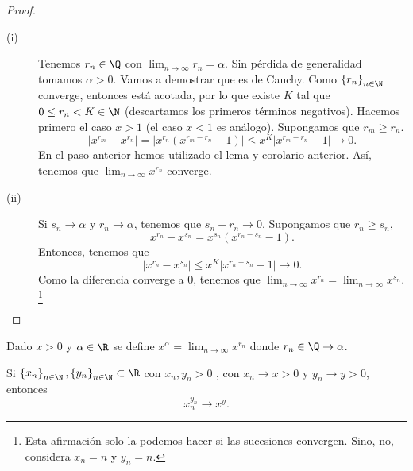 \begin{proof}
\begin{description}
	\item[(i)] Tenemos $\displaystyle r_{n}\in\Q $ con $\displaystyle \lim_{n \to \infty}r_{n}=\alpha  $. Sin pérdida de generalidad tomamos $\displaystyle \alpha > 0 $. Vamos a demostrar que es de Cauchy. Como $\displaystyle \left\{ r_{n}\right\} _{n\in\N}$ converge, entonces está acotada, por lo que existe $\displaystyle K $ tal que $\displaystyle 0 \leq r_{n} < K \in \N $ (descartamos los primeros términos negativos). Hacemos primero el caso $\displaystyle x > 1 $ (el caso $\displaystyle x < 1 $ es análogo). Supongamos que $\displaystyle r_{m} \geq r_{n} $. 
	\[ \left|x^{r_{m}}-x^{r_{n}}\right| = \left|x^{r_{n}}\left(x^{r_{m}-r_{n}}-1\right)\right| \leq x^{K} \left|x^{r_{m}-r_{n}}-1\right| \to 0 .\]
En el paso anterior hemos utilizado el lema y corolario anterior. Así, tenemos que $\displaystyle \lim_{n \to \infty}x^{r_{n}} $ converge. 
\item[(ii)] Si $\displaystyle s_{n} \to \alpha  $ y $\displaystyle r_{n} \to \alpha  $, tenemos que $\displaystyle s_{n}-r_{n} \to 0 $. Supongamos que $\displaystyle r_{n} \geq s_{n} $,
\[ x^{r_{n}}-x^{s_{n}} = x^{s_{n}}\left(x^{r_{n}-s_{n}}-1\right) .\]
Entonces, tenemos que
\[ \left|x^{r_{n}}-x^{s_{n}}\right| \leq x^{K} \left|x^{r_{n}-s_{n}}-1\right| \to 0 .\]
Como la diferencia converge a 0, tenemos que $\displaystyle \lim_{n \to \infty}x^{r_{n}} = \lim_{n \to \infty}x^{s_{n}} $. \footnote{Esta afirmación solo la podemos hacer si las sucesiones convergen. Sino, no, considera $\displaystyle x_{n} = n $ y $\displaystyle y_{n} = n $.} 
\end{description}
\end{proof}

\begin{fdefinition}[]
\normalfont Dado $\displaystyle x > 0 $ y $\displaystyle \alpha \in\R $ se define $\displaystyle x^{\alpha } = \lim_{n \to \infty}x^{r_{n}} $ donde $\displaystyle r_{n} \in \Q\to \alpha  $.
\end{fdefinition}

\begin{fprop}[]
	\normalfont Si $\displaystyle \left\{ x_{n}\right\} _{n\in\N}, \left\{ y_{n}\right\} _{n\in\N} \subset\R $ con $\displaystyle x_{n}, y_{n} > 0 $ , con $\displaystyle x_{n} \to x > 0 $ y $\displaystyle y_{n} \to y > 0 $, entonces
	\[x_{n}^{y_{n}} \to x^{y} .\]
\end{fprop}

